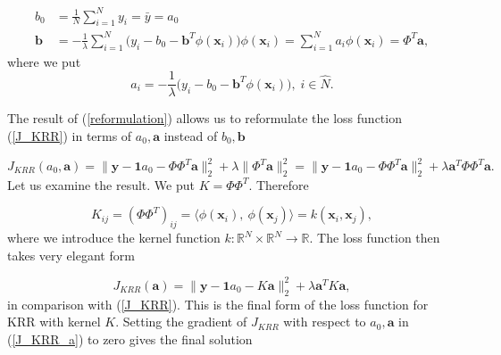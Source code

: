 \documentclass[11pt,oneside,czech,american]{book} %
\theoremstyle{plain}
\theoremstyle{definition}
\begin{document}
\begin{equation}
	\begin{aligned}
			{b}_0 &= \frac{1}{N} \sum_{i=1}^{N} y_i = \bar{y} = a_0\\
		\bm{b} &= -\frac{1}{\lambda} \sum_{i=1}^{N}\Big( y_i - b_0 -\bm{b}^T \phi(\bm{x}_i) \Big)\phi(\bm{x}_i) = \sum_{i=1}^{N} a_i \phi(\bm{x}_i) = \Phi^T \bm{a},
	\end{aligned}
	\label{reformulation}
\end{equation}
where we put 
\begin{equation}
	a_i = -\frac{1}{\lambda} \Big( y_i - b_0 -\bm{b}^T \phi(\bm{x}_i) \Big), \; i \in \hat{N}.
\end{equation}

The result of (\ref{reformulation}) allows us to reformulate the loss function (\ref{J_KRR}) in terms of $a_0, \bm{a}$ instead of $b_0, \bm{b}$

\begin{equation}
	J_{KRR}(a_0, \bm{a}) = \| \bm{y} - \bm{1}a_0 - \Phi \Phi^T \bm{a} \|^2_2 + \lambda \| \Phi^T \bm{a} \|^2_2 = \| \bm{y} - \bm{1}a_0 - \Phi \Phi^T \bm{a} \|^2_2 + \lambda \bm{a}^T \Phi \Phi^T \bm{a}.
\end{equation}
Let us examine the result. We put  $K = \Phi \Phi^T$. Therefore

\begin{equation}
	K_{ij} = (\Phi \Phi^T)_{ij} =  \langle \phi(\bm{x}_i), \  \phi(\bm{x}_j) \rangle = k(\bm{x}_i, \bm{x}_j),
\end{equation}
where we introduce the kernel function $k: \mathbb{R}^N \times \mathbb{R}^N \rightarrow \mathbb{R}$. The loss function then takes very elegant form

\begin{equation}
	J_{KRR}(\bm{a}) = \|\bm{y} - \bm{1}a_0 - K \bm{a} \|^2_2 + \lambda \bm{a}^T K \bm{a}, \label{J_KRR_a}
\end{equation}
in comparison with (\ref{J_KRR}).
This is the final form of the loss function for KRR with kernel $K$. Setting the gradient of $J_{KRR}$ with respect to $a_0, \bm{a}$ in (\ref{J_KRR_a}) to zero gives the final solution
\end{document}
